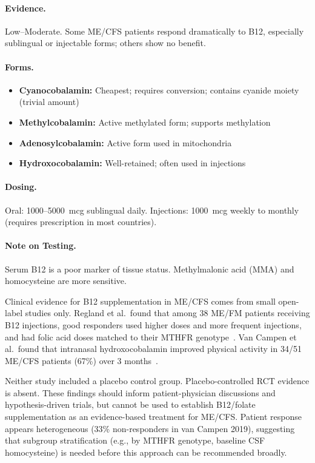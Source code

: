 \paragraph{Evidence.} Low--Moderate. Some ME/CFS patients respond dramatically to B12, especially sublingual or injectable forms; others show no benefit.

\paragraph{Forms.}
\begin{itemize}
    \item \textbf{Cyanocobalamin:} Cheapest; requires conversion; contains cyanide moiety (trivial amount)
    \item \textbf{Methylcobalamin:} Active methylated form; supports methylation
    \item \textbf{Adenosylcobalamin:} Active form used in mitochondria
    \item \textbf{Hydroxocobalamin:} Well-retained; often used in injections
\end{itemize}

\paragraph{Dosing.} Oral: 1000--5000~mcg sublingual daily. Injections: 1000~mcg weekly to monthly (requires prescription in most countries).

\paragraph{Note on Testing.} Serum B12 is a poor marker of tissue status. Methylmalonic acid (MMA) and homocysteine are more sensitive.

\begin{warning}
\label{warn:b12-evidence-quality}
Clinical evidence for B12 supplementation in ME/CFS comes from small open-label studies only.
Regland et al.\ found that among 38 ME/FM patients receiving B12 injections, good responders
used higher doses and more frequent injections, and had folic acid doses matched to their MTHFR
genotype~\cite{Regland2015}. Van Campen et al.\ found that intranasal hydroxocobalamin improved
physical activity in 34/51 ME/CFS patients (67\%) over 3 months~\cite{vanCampen2019}.

Neither study included a placebo control group. Placebo-controlled RCT evidence is absent.
These findings should inform patient-physician discussions and hypothesis-driven trials, but
cannot be used to establish B12/folate supplementation as an evidence-based treatment for
ME/CFS. Patient response appears heterogeneous (33\% non-responders in van Campen 2019),
suggesting that subgroup stratification (e.g., by MTHFR genotype, baseline CSF homocysteine)
is needed before this approach can be recommended broadly.
\end{warning}

